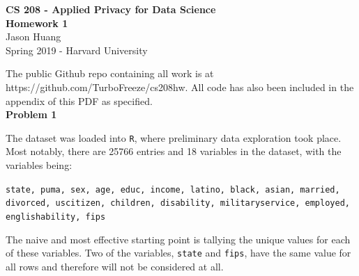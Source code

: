 \documentclass[12pt]{article}
\begin{document}
\begin{center}
	{\Large \textbf{CS 208 - Applied Privacy for Data Science}}\\
	{\Large \textbf{Homework 1}}\\
	\vspace*{0.1in}
	Jason Huang\\
	Spring 2019 - Harvard University\\
\end{center}

The public Github repo containing all work is at https://github.com/TurboFreeze/cs208hw. All code has also been included in the appendix of this PDF as specified.\\

{\large\textbf{Problem 1}}


The dataset was loaded into \texttt{R}, where preliminary data exploration took place. Most notably, there are 25766 entries and 18 variables in the dataset, with the variables being:
\begin{center}
\texttt{state, puma, sex, age, educ, income, latino, black, asian, married, divorced, uscitizen, children, disability, militaryservice, employed, englishability, fips}
\end{center}
The naive and most effective starting point is tallying the unique values for each of these variables. Two of the variables, \texttt{state} and \texttt{fips}, have the same value for all rows and therefore will not be considered at all.

\end{document}
